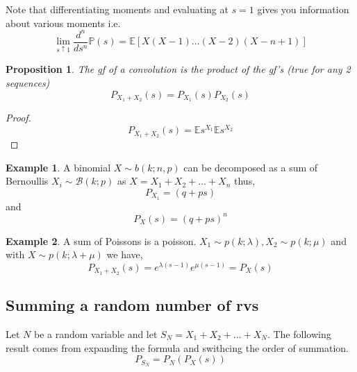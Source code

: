 \documentclass[a4paper]{report}
\newtheorem{proposition}[chapter]{Proposition}
\theoremstyle{definition}
\newtheorem{example}{Example}[chapter]
\theoremstyle{remark}
\begin{document}
Note that differentiating moments and evaluating at $s=1$ gives you information about various moments i.e.
\begin{equation}
  \lim_{ s \uparrow 1 } \frac{d^{ n }}{ds^{ n }} \mathbb{P}(s) = \mathbb{E}[X(X-1)...(X-2)(X-n+1)]
\end{equation}

\begin{proposition}
The gf of a convolution is the product of the gf's (true for any 2 sequences)
\[
P_{X_{1} + X_{2}}(s) = P_{X_{1}}(s) P_{X_{2}}(s)
\]

\end{proposition}

\begin{proof}
  \[
P_{X_{1} + X_{2}}(s) = \mathbb{E}s^{X_{1}}\mathbb{E}s^{X_{2}}
\]
\end{proof}

\begin{example}
A binomial $X \sim b(k; n, p)$ can be decomposed as a sum of Bernoullis $X_{i} \sim \mathcal{B} (k; p)$ as $X = X_{1} + X_{2} + ... + X_{n}$ thus,
\[
P_{X_{1}} = (q + ps)
\]
and \[
P_{X} (s) = (q + ps)^{n} 
\]

\end{example}

\begin{example}
A sum of Poissons is a poisson. $X_{1} \sim p(k;\lambda), X_{2} \sim p(k; \mu)$ and with $X \sim p(k; \lambda + \mu)$ we have,
\[
P_{X_{1} + X_{2}} (s) = e^{\lambda(s-1)} e^{\mu(s-1)} = P_{X} (s)
\]

\end{example}

\subsection{Summing a random number of rvs}
Let $N$ be a random variable and let $S_{N} = X_{1} + X_{2} + ... + X_{N}$. The following result comes from expanding the formula and swithcing the order of summation.
\begin{equation}
P_{S_{N}} = P_{N}(P_{X}(s))
\end{equation}
\end{document}
